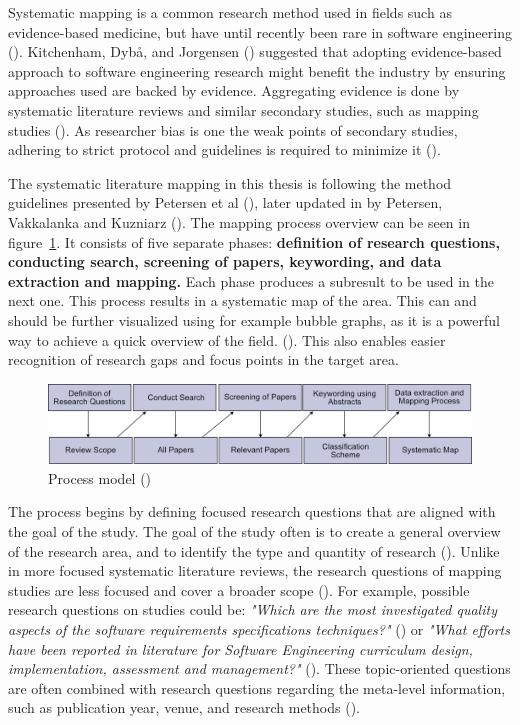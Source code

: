 \documentclass[utf8,english]{gradu3}
\begin{document}
Systematic mapping is a common research method used in fields such as
evidence-based medicine, but have until recently been rare in software
engineering (\cite{petersen2008}). Kitchenham, Dybå, and Jorgensen
(\cite*{kitchenham2004}) suggested that adopting evidence-based approach to
software engineering research might benefit the industry by ensuring approaches
used are backed by evidence. Aggregating evidence is done by systematic
literature reviews and similar secondary studies, such as mapping studies
(\cite{kitchenham2010}). As researcher bias is one the weak points of secondary
studies, adhering to strict protocol and guidelines is required to minimize it
(\cite{brereton2007}).


The systematic literature mapping in this thesis is following the method
guidelines presented by Petersen et al (\cite*{petersen2008}), later updated in
by Petersen, Vakkalanka and Kuzniarz (\cite*{petersen2015}). The mapping process
overview can be seen in figure~\ref{fig:mapping}. It consists of five separate
phases: \textbf{definition of research questions, conducting search, screening
  of papers, keywording, and data extraction and mapping.} Each phase produces a
subresult to be used in the next one. This process results in a systematic map
of the area. This can and should be further visualized using for example bubble
graphs, as it is a powerful way to achieve a quick overview of the field.
(\cite{petersen2008}). This also enables easier recognition of research gaps and
focus points in the target area.


\begin{figure}[H]
  \includegraphics[width=\linewidth]{images/petersen_model.png}
  \caption{Process model (\cite{petersen2008})}
  \label{fig:mapping}
\end{figure}

The process begins by defining focused research questions that are aligned with
the goal of the study. The goal of the study often is to create a general
overview of the research area, and to identify the type and quantity of research
(\cite{petersen2008}). Unlike in more focused systematic literature reviews, the
research questions of mapping studies are less focused and cover a broader scope
(\cite{kitchenham2010}). For example, possible research questions on studies
could be: \emph{"Which are the most investigated quality aspects of the software
  requirements specifications techniques?"} (\cite{condori2009}) or \emph{"What
  efforts have been reported in literature for Software Engineering curriculum
  design, implementation, assessment and management?"} (\cite{qadir2011}). These
topic-oriented questions are often combined with research questions regarding
the meta-level information, such as publication year, venue, and research
methods (\cite{petersen2015}).
\end{document}

